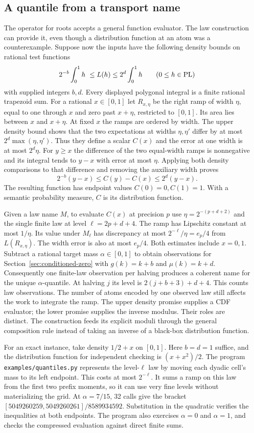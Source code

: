 \subsection{A quantile from a transport name}

The operator for roots accepts a general function evaluator. The law
construction can provide it, even though a distribution function at an
atom was a counterexample. Suppose now the inputs have the following density bounds on rational test functions
\[
 2^{-b}\int_0^1 h\ \le L(h)\le 2^d\int_0^1 h
 \qquad(0\le h\in\mathrm{PL})
\]
with supplied integers $b,d$. Every displayed polygonal integral is a finite
rational trapezoid sum. For a rational $x\in[0,1]$ let $R_{x,\eta}$ be the
right ramp of width $\eta$, equal to one through $x$ and zero past $x+\eta$,
restricted to $[0,1]$. Its area lies between $x$ and $x+\eta$. At fixed
$x$ the ramps are ordered by width. The upper density bound shows that the
two expectations at widths $\eta,\eta'$ differ by at most
$2^d\max(\eta,\eta')$. Thus they define a scalar $C(x)$ and the error at
one width is at most $2^d\eta$. For $y\ge x$ the difference of the two
equal-width ramps is nonnegative and its integral tends to $y-x$ with
error at most $\eta$. Applying both density comparisons to that difference
and removing the auxiliary width proves
\[
 2^{-b}(y-x)\le C(y)-C(x)\le2^d(y-x).
\]
The resulting function has endpoint values $C(0)=0,C(1)=1$. With
a semantic probability measure, $C$ is its distribution function.

Given a law name $M$, to evaluate $C(x)$ at precision $p$ use
$\eta=2^{-(p+d+2)}$ and the single finite law at level $\ell=2p+d+4$.
The ramp has Lipschitz constant at most $1/\eta$. Its value under $M_\ell$
has discrepancy at most $2^{-\ell}/\eta=e_p/4$ from $L(R_{x,\eta})$.
The width error is also at most $e_p/4$. Both estimates include $x=0,1$.
Subtract a rational target mass $\alpha\in[0,1]$ to obtain observations
for Section~\ref{sec:conditioned-zero} with $g(k)=k+b$ and $\mu(k)=k+d$.
Consequently one finite-law observation per halving produces a coherent name
for the unique $\alpha$-quantile. At halving $j$ its level is
$2(j+b+3)+d+4$. This counts law observations. The number of atoms encoded
by one observed law still affects the work to integrate the ramp. The upper
density promise supplies a CDF evaluator; the lower promise supplies the
inverse modulus. Their roles are distinct. The construction feeds its
explicit moduli through the general composition rule instead of taking an
inverse of a black-box distribution function.


For an exact instance, take density $1/2+x$ on $[0,1]$. Here $b=d=1$
suffice, and the distribution function for independent checking is
$(x+x^2)/2$. The program \texttt{examples/quantiles.py} represents the
level-$\ell$ law by moving each dyadic cell's mass to its left endpoint.
This costs at most $2^{-\ell}$. It sums a ramp on this law from the first
two prefix moments, so it can use very fine levels without materializing the
grid. At $\alpha=7/15$, 32 calls give the bracket
$[5049260259,5049260261]/8589934592$. Substitution in the quadratic verifies
the inequalities at both endpoints. The program also exercises $\alpha=0$
and $\alpha=1$, and checks the compressed evaluation against direct finite sums.
